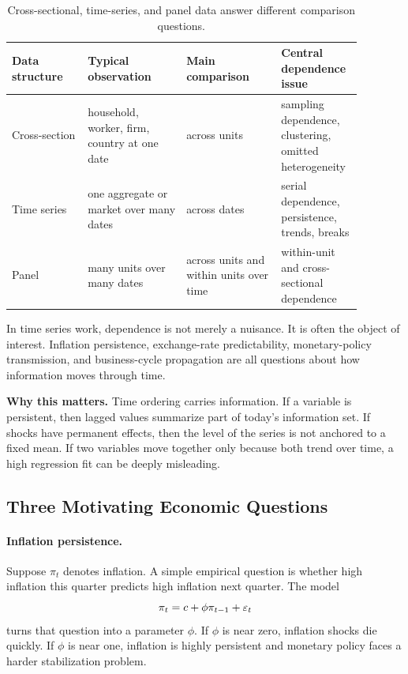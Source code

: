 \begin{table}[h]
\centering
\small
\begin{tabular}{p{0.20\linewidth}p{0.26\linewidth}p{0.25\linewidth}p{0.17\linewidth}}
\toprule
Data structure & Typical observation & Main comparison & Central dependence issue \\
\midrule
Cross-section & household, worker, firm, country at one date & across units & sampling dependence, clustering, omitted heterogeneity \\
Time series & one aggregate or market over many dates & across dates & serial dependence, persistence, trends, breaks \\
Panel & many units over many dates & across units and within units over time & within-unit and cross-sectional dependence \\
\bottomrule
\end{tabular}
\caption{Cross-sectional, time-series, and panel data answer different comparison questions.}
\label{tab:data_structures_ts}
\end{table}

In time series work, dependence is not merely a nuisance. It is often the object of interest. Inflation persistence, exchange-rate predictability, monetary-policy transmission, and business-cycle propagation are all questions about how information moves through time.

\begin{boxD}
\textbf{Why this matters.}
Time ordering carries information. If a variable is persistent, then lagged values summarize part of today's information set. If shocks have permanent effects, then the level of the series is not anchored to a fixed mean. If two variables move together only because both trend over time, a high regression fit can be deeply misleading.
\end{boxD}

\subsection{Three Motivating Economic Questions}
\paragraph{Inflation persistence.}
Suppose $\pi_t$ denotes inflation. A simple empirical question is whether high inflation this quarter predicts high inflation next quarter. The model
\[
\pi_t=c+\phi \pi_{t-1}+\varepsilon_t
\]
turns that question into a parameter $\phi$. If $\phi$ is near zero, inflation shocks die quickly. If $\phi$ is near one, inflation is highly persistent and monetary policy faces a harder stabilization problem.

